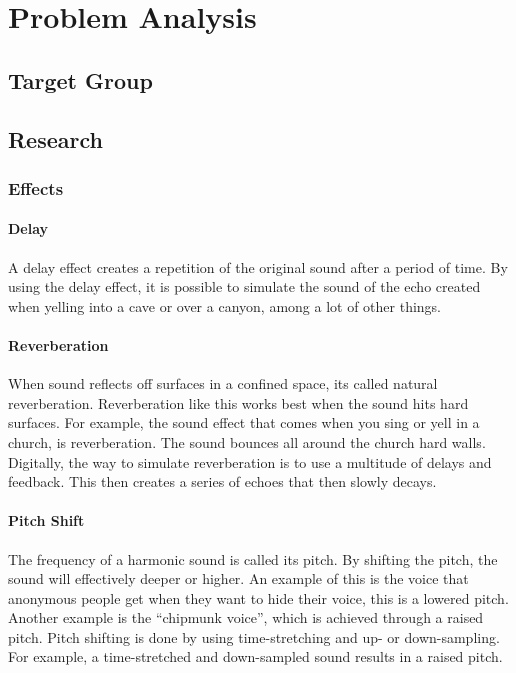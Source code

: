 \chapter{Problem Analysis}


\section{Target Group}


\section{Research}

\subsection{Effects}

\subsubsection{Delay}

A delay effect creates a repetition of the original sound after a period of time\citep{Loeffler_2014}. By using the delay effect, it is possible to simulate the sound of the echo created when yelling into a cave or over a canyon, among a lot of other things.

\subsubsection{Reverberation}

When sound reflects off surfaces in a confined space, its called natural reverberation\citep{Redmon_1997}. Reverberation like this works best when the sound hits hard surfaces. For example, the sound effect that comes when you sing or yell in a church, is reverberation. The sound bounces all around the church hard walls.
Digitally, the way to simulate reverberation is to use a multitude of delays and feedback. This then creates a series of echoes that then slowly decays.

\subsubsection{Pitch Shift}

The frequency of a harmonic sound is called its pitch\citep{Katjaas_00}. By shifting the pitch, the sound will effectively deeper or higher. An example of this is the voice that anonymous people get when they want to hide their voice, this is a lowered pitch. Another example is the “chipmunk voice”, which is achieved through a raised pitch.
Pitch shifting is done by using time-stretching and up- or down-sampling. For example, a time-stretched and down-sampled sound results in a raised pitch.\\

